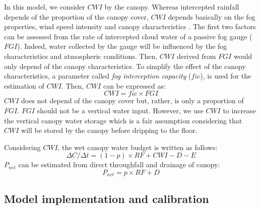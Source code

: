 \documentclass[a4paper,12pt]{article}
\begin{document}
In this model, we consider $CWI$ by the canopy. Whereas intercepted rainfall depends of the proportion of the canopy cover, $CWI$ depends basically on the fog properties, wind speed intensity and canopy characteristics \citep{Bruijnzeeletal2006, Villegasetal2008, Holwerdaetal2010}. The first two factors can be assessed from the rate of intercepted cloud water of a passive fog gauge ($FGI$). Indeed, water collected by the gauge will be influenced by the fog characteristics and atmospheric conditions. Then, $CWI$ derived from $FGI$ would only depend of the canopy characteristics. To simplify the effect of the canopy characteristics, a parameter called \textit{fog interception capacity} ($fic$), is used for the estimation of $CWI$. Then, $CWI$ can be expressed as:
\begin{equation} \label{eq:fog_wi}
    CWI = fic \times FGI
\end{equation}
$CWI$ does not depend of the canopy cover but, rather, is only a proportion of $FGI$. $FGI$ should not be a vertical water input. However, we use $CWI$ to increase the vertical canopy water storage which is a fair assumption considering that $CWI$ will be stored by the canopy before dripping to the floor. 

Considering $CWI$, the wet canopy water budget is written as follows:
\begin{equation} \label{eq:fog_can_bal_cwi}
    \Delta C/\Delta t = (1 - p) \times RF + CWI - D - E 
\end{equation}
$P_{net}$ can be estimated from direct throughfall and drainage of canopy:
\begin{equation} \label{eq:fog_thfall}
P_{net}=p \times RF + D
\end{equation} 

\subsection{Model implementation and calibration}
\end{document}
